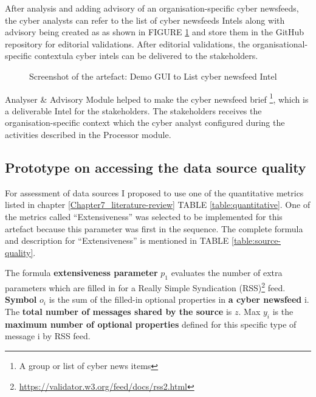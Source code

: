 After analysis and adding advisory of an organisation-specific cyber newsfeeds, 
the cyber analysts can refer to the list of cyber newsfeeds Intels along with advisory being created as 
as shown in FIGURE \ref{fig:analyst-advisory-demo} and store them in the  GitHub repository for editorial validations. After editorial validations, the organisational-specific contextula cyber intels can be delivered to the stakeholders.

 
\begin{figure}[ht]
    \centering
    \caption{Screenshot of the artefact: Demo GUI to List cyber newsfeed Intel}
    \label{fig:analyst-advisory-demo}
\end{figure}
 \FloatBarrier

Analyser \& Advisory Module helped to make the cyber newsfeed brief \footnote{A group or list of cyber news items}, which is a deliverable Intel for the stakeholders. 
The stakeholders receives the organisation-specific  context which the cyber analyst configured during the activities described in the Processor module. 

\subsection{Prototype on accessing the data source quality}
\label{quality_source}
For assessment of data sources I proposed to use one of the quantitative metrics listed in chapter  
\ref{Chapter7_literature-review}
TABLE \ref{table:quantitative}.
One of the metrics called \enquote{Extensiveness} was selected to be   implemented for this artefact because this parameter was first in the sequence. The complete formula and description for \enquote{Extensiveness} is mentioned in TABLE  \ref{table:source-quality}. 

The formula \textbf{extensiveness parameter} $p_1$ evaluates the number of extra parameters which are filled in for a Really Simple Syndication (RSS)\footnote{\url{https://validator.w3.org/feed/docs/rss2.html} } feed. 
\textbf{Symbol} $o_i$
is the sum of the filled-in optional
properties in \textbf{a cyber newsfeed} i. The \textbf{ total number of
messages shared by the source} is $z$. 
Max $y_i$ 
is the \textbf{maximum number
of optional properties} defined for this specific type of message i by
 RSS feed.



